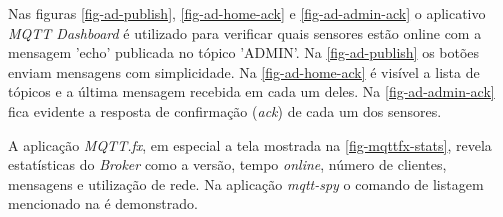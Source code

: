Nas figuras \ref{fig-ad-publish}, \ref{fig-ad-home-ack} e \ref{fig-ad-admin-ack}
o aplicativo \emph{MQTT Dashboard} é utilizado para verificar quais sensores
estão online com a mensagem 'echo' publicada no tópico 'ADMIN'. Na
\autoref{fig-ad-publish} os botões enviam mensagens com simplicidade. Na
\autoref{fig-ad-home-ack} é visível a lista de tópicos e a última mensagem
recebida em cada um deles. Na \autoref{fig-ad-admin-ack} fica evidente a
resposta de confirmação (\emph{ack}) de cada um dos sensores.

A aplicação \emph{MQTT.fx}, em especial a tela mostrada na
\autoref{fig-mqttfx-stats}, revela estatísticas do \emph{Broker} como a versão,
tempo \emph{online}, número de clientes, mensagens e utilização de rede.
Na aplicação \emph{mqtt-spy} o comando de listagem mencionado na
 é demonstrado.

